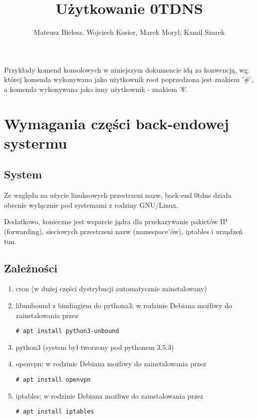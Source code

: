 \documentclass{hitec}
\author{Mateusz Bielesz, Wojciech Kosior, Marek Moryl, Kamil Szarek}
\title{Użytkowanie 0TDNS}
\begin{document}
\maketitle

\begin{sloppypar}

Przykłady komend konsolowych w niniejszym dokumencie idą za konwencją, wg.
której komenda wykonywana jako użytkownik root poprzedzona jest znakiem '\#',
a komenda wykonywana jako inny użytkownik - znakiem '\$'.

\section{Wymagania części back-endowej systermu}
\subsection{System}
Ze względu na użycie linuksowych przestrzeni nazw, back-end 0tdns działa obecnie
wyłącznie pod systemami z rodziny GNU/Linux.

Dodatkowo, konieczne jest wsparcie jądra dla przekazywanie pakietów IP
(forwarding), sieciowych przestrzeni nazw (namespace'ów), iptables i urządzeń
tun.

\subsection{Zależności}
\begin{enumerate}
\item cron (w dużej części dystrybucji automatycznie zainstalowany)
\item libunbound z bindingiem do pythona3; w rodzinie Debiana możliwy do
  zainstalowania przez
\begin{verbatim}
# apt install python3-unbound
\end{verbatim}
\item python3 (system był tworzony pod pythonem 3.5.3)
\item openvpn; w rodzinie Debiana możliwy do zainstalowania przez
\begin{verbatim}
# apt install openvpn
\end{verbatim}
\item iptables; w rodzinie Debiana możliwe do zainstalowania przez
\begin{verbatim}
# apt install iptables
\end{verbatim}
\end{enumerate}


\end{sloppypar}
\end{document}
